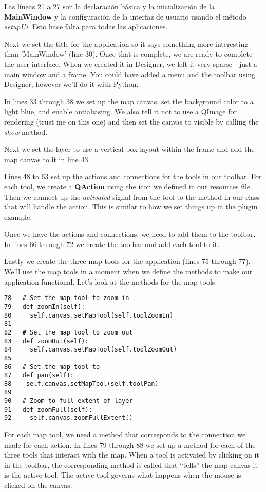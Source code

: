 Las líneas 21 a 27 son la declaración básica y la inicialización de la \textbf{MainWindow}
y la configuración de la interfaz de usuario usando el método \textsl{setupUi}. Esto hace
falta para todas las aplicaciones.

Next we set the title for the application so it says something more
interesting than 'MainWindow' (line 30). Once that is
complete, we are ready to complete the user interface. When we created it in
Designer, we left it very sparse---just a main window and a frame. You could
have added a menu and the toolbar using Designer, however we'll do it with
Python.

In lines 33 through 38 we set up the map
canvas, set the background color to a light blue, and enable antialiasing.
We also tell it not to use a QImage for rendering (trust me on this one) and
then set the canvas to visible by calling the \textsl{show} method.

Next we set the layer to use a vertical box layout within the frame and add the map
canvas to it in line 43.

Lines 48 to 63 set up the actions and connections for the tools in our 
toolbar. For each tool, we create a
\textbf{QAction} using the icon we defined in our resources file. Then we
connect up the \textsl{activated} signal from the tool to the method in our
class that will handle the action. This is similar to how we set things up
in the plugin example.

Once we have the actions and connections, we need to add them to the
toolbar. In lines 66 through 72 we create the
toolbar and add each tool to it.

Lastly we create the three map tools for the application (lines
75 through 77). We'll use the map tools in a
moment when we define the methods to make our application functional. Let's
look at the methods for the map tools.

\begin{verbatim}
78   # Set the map tool to zoom in
79   def zoomIn(self):
80     self.canvas.setMapTool(self.toolZoomIn)
81 
82   # Set the map tool to zoom out
83   def zoomOut(self):
84     self.canvas.setMapTool(self.toolZoomOut)
85 
86   # Set the map tool to 
87   def pan(self):
88    self.canvas.setMapTool(self.toolPan)
89 
90   # Zoom to full extent of layer
91   def zoomFull(self):
92     self.canvas.zoomFullExtent()
\end{verbatim}

For each map tool, we need a method that corresponds to the connection we
made for each action. In lines 79 through 88 we set up a method for each 
of the three tools that
interact with the map. When a tool is activated by clicking on it in the
toolbar, the corresponding method is called that ``tells'' the map canvas it
is the active tool. The active tool governs what happens when the mouse is
clicked on the canvas.

